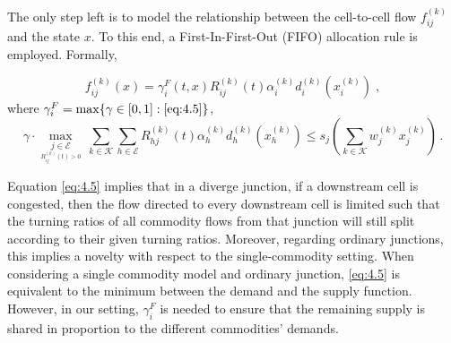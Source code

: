 \documentclass[preprint,12pt]{elsarticle}
\newcommand{\be}{\begin{equation}}
\newcommand{\ee}{\end{equation}}
\begin{document}
The only step left is to model the relationship between the cell-to-cell flow $f_{ij}^{(k)}$ and the state $x$. To this end, a First-In-First-Out (FIFO) allocation rule is employed. Formally,

\begin{equation}\label{eq:fifo}
	f_{ij}^{(k)}(x) = \gamma_i^F(t,x)R_{ij}^{(k)}(t)\alpha_i^{(k)}d_{i}^{(k)}(x_{i}^{(k)}) \; ,
\end{equation}
where $\gamma_{i}^{F}  =\max \{  \gamma \in [0,1] :    \eqref{eq:4.5}\}$,
\be\label{eq:4.5}
\gamma \cdot \underset{\underset{R_{ij}^{(k)}(t)>0}{j \in \mathcal{E}}}{\max} \:\sum\limits_{k \in \mathcal{K}}\sum\limits_{h \in \mathcal{E}} R_{hj}^{(k)}(t)\alpha_h^{(k)}d_{h}^{(k)}(x_{h}^{(k)}) 
\le  s_j(\sum\limits_{k \in \mathcal{K}}{w_j^{(k)}x_{j}^{(k)}})\,.\ee

Equation \eqref{eq:4.5} implies that in a diverge junction, if a downstream cell is congested, then the flow directed to every downstream cell is limited such that the turning ratios of all commodity flows from that junction will still split according to their given turning ratios.  Moreover, regarding ordinary junctions, this implies a novelty with respect to the single-commodity setting. When considering a single commodity model and ordinary junction, \eqref{eq:4.5} is equivalent to the minimum between the demand and the supply function. However, in our setting, $\gamma_i^{F}$ is needed to ensure that the remaining supply is shared in proportion to the different commodities' demands. 
\end{document}
